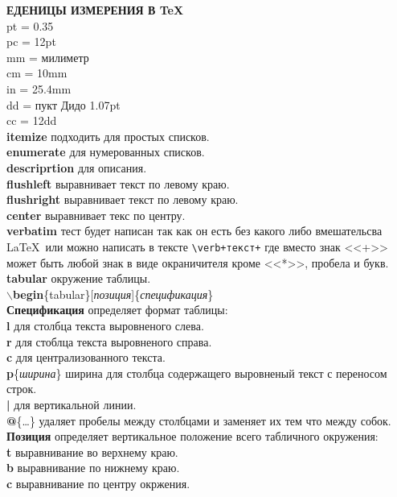 \documentclass{article}
\newcommand{\bs}{$\backslash$}
\newcommand{\bd}[1]{{\bfseries #1}} %
\newcommand{\bb}[1]{\bd{\bs #1}} %
\begin{document}
\bd{ЕДЕНИЦЫ ИЗМЕРЕНИЯ В \TeX}\\
pt = 0.35\\
pc = 12pt\\
mm = милиметр\\
cm = 10mm\\
in = 25.4mm\\
dd = пукт Дидо 1.07pt\\
cc = 12dd\\

\bd{itemize} подходить для простых списков.\\
\bd{enumerate} для нумерованных списков.\\
\bd{descriprtion} для описания.\\
\bd{flushleft} выравнивает текст по левому краю.\\
\bd{flushright} выравнивает текст по левому краю.\\
\bd{center} выравнивает текс по центру.\\
\bd{verbatim} тест будет написан так как он есть без какого либо вмешательсва
\LaTeX~или можно написать в тексте \verb|\verb+текст+| где вместо знак <<+>>
может быть любой знак в виде окраничителя кроме <<*>>, пробела и букв.\\

\bd{tabular} окружение таблицы.\\
\bb{begin}\{tabular\}[\emph{позиция}]\{\emph{спецификация}\}\\

\bd{Спецификация} определяет формат таблицы:\\
\bd{l} для столбца текста выровненого слева.\\
\bd{r} для стоблца текста выровненого справа.\\
\bd{c} для централизованного текста.\\
\bd{p}\{\emph{ширина}\} ширина для столбца содержащего выровненый текст
с переносом строк.\\
\bd{|} для вертикальной линии.\\
\bd{@}\{\ldots\} удаляет пробелы между столбцами
и заменяет их тем что между собок.\\

\bd{Позиция} определяет вертикальное положение всего табличного окружения:\\
\bd{t} выравнивание во верхнему краю.\\
\bd{b} выравнивание по нижнему краю.\\
\bd{c} выравнивание по центру окржения.\\
\end{document}
